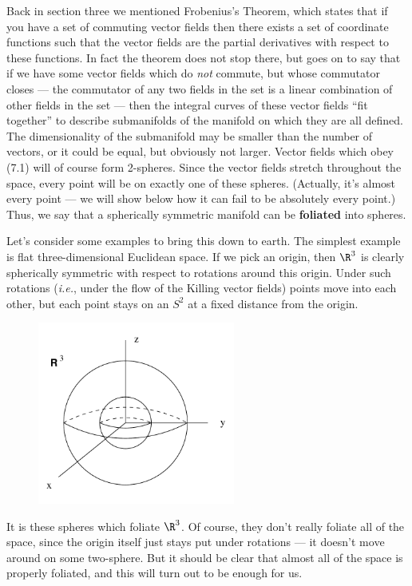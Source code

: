 \documentclass[12pt]{article}
\begin{document}
Back in section three we mentioned Frobenius's Theorem, which states
that if you have a set of commuting vector fields then there exists a
set of coordinate
functions such that the vector fields are the partial derivatives
with respect to these functions.  In fact the theorem does not stop 
there, but goes on to say that if we have some vector fields which do
{\it not} commute, but whose commutator closes --- the commutator of
any two fields in the set is a linear combination of other fields in
the set --- then the integral curves of these vector fields ``fit
together'' to describe submanifolds of the manifold on which they are
all defined.  The dimensionality of the submanifold may be smaller 
than the number of vectors, or it could be equal, but obviously not
larger.  Vector fields which obey (7.1) will of course form 2-spheres.
Since the vector fields stretch throughout the space, every point will
be on exactly one of these spheres.  (Actually, it's almost every point
--- we will show below how it can fail to be absolutely every point.)
Thus, we say that a spherically symmetric manifold can be {\bf foliated}
into spheres.  

Let's consider some examples to bring this down to earth.  The simplest
example is flat three-dimensional Euclidean space.  If we pick an origin,
then $\R^3$ is clearly spherically symmetric with respect to rotations
around this origin.  
Under such rotations ({\it i.e.}, under the 
flow of the Killing vector fields) points move into each other, but
each point stays on an $S^2$ at a fixed distance from the origin.

\begin{figure}[h]
  \centerline{
  \includegraphics[height=6cm]{pdf/seven1}}
\end{figure}

\noindent
It is these spheres which foliate $\R^3$.
Of course, they don't really foliate all of the space, since
the origin itself just stays put under rotations --- it doesn't move
around on some two-sphere.  But it should be clear that almost all of
the space is properly foliated, and this will turn out to be enough for
us.  
\end{document}
